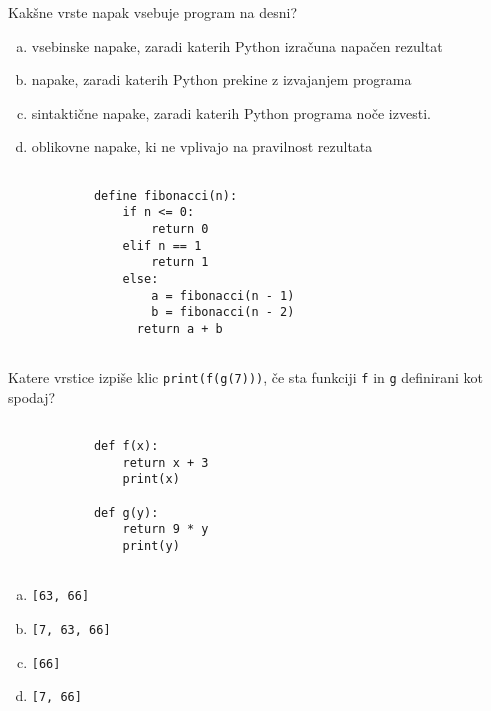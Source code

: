\documentclass[arhiv, 10pt]{../izpit}
\newcommand{\inlinepy}[1]{\texttt{#1}}
\begin{document}
        \naloga*
        \begin{multicols}{2}
        \noindent
        Kakšne vrste napak vsebuje program na desni?

        \begin{enumerate}[(a)]
\item vsebinske napake, zaradi katerih Python izračuna napačen rezultat
\item napake, zaradi katerih Python prekine z izvajanjem programa
\item sintaktične napake, zaradi katerih Python programa noče izvesti.
\item oblikovne napake, ki ne vplivajo na pravilnost rezultata
\end{enumerate}

        \columnbreak

        \begin{verbatim}
        
            define fibonacci(n):
                if n <= 0:
                    return 0
                elif n == 1
                    return 1
                else:
                    a = fibonacci(n - 1)
                    b = fibonacci(n - 2)
                  return a + b
            
        \end{verbatim}

        \end{multicols}

    
        \naloga*
        Katere vrstice izpiše klic \inlinepy{print(f(g(7)))}, če sta funkciji \inlinepy{f} in \inlinepy{g} definirani kot spodaj?

        \begin{multicols}{2}
        \begin{verbatim}
        
            def f(x):
                return x + 3
                print(x)

            def g(y):
                return 9 * y
                print(y)
        
        \end{verbatim}

        \begin{enumerate}[(a)]
\item \inlinepy{[63, 66]}
\item \inlinepy{[7, 63, 66]}
\item \inlinepy{[66]}
\item \inlinepy{[7, 66]}
\end{enumerate}

        \end{multicols}
    
\end{document}

